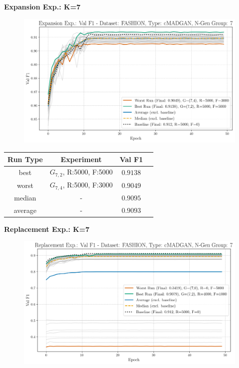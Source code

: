 \newpage
\noindent\textbf{Expansion Exp.: K=7}
\begin{figure}[htbp]
	\centering
	\includegraphics[width=.85\textwidth]{abb/strat_classifier_performance/FASHION_STRATIFIED_CLASSIFIERS_cMADGAN_NEW/expansion_experiments/val_f1_score_cMADGAN_FASHION_n_gen_7_all.png}
	\label{fig:app_strat_class_performance_expansion_exp._val_f1_score_7}
\end{figure}
\begin{table}[H]
	\vspace{-1em}
	\centering
	\begin{tabular}{|c|c|c|c|}
		\hline
		Run Type & Experiment & Val F1 \\ \hline
		best & \(G_{7, 2}\), R:5000, F:5000 & $0.9138$\\ \hline
		worst & \(G_{7, 4}\), R:5000, F:3000 & $0.9049$\\ \hline
		median & - & $0.9095$\\ \hline
		average & - & $0.9093$
		\\ \hline
	\end{tabular}
\end{table}
\noindent\textbf{Replacement Exp.: K=7}
\begin{figure}[htbp]
	\centering
	\includegraphics[width=.85\textwidth]{abb/strat_classifier_performance/FASHION_STRATIFIED_CLASSIFIERS_cMADGAN_NEW/replacement_experiments/val_f1_score_cMADGAN_FASHION_n_gen_7_all.png}
	\label{fig:app_strat_class_performance_replacement_exp._val_f1_score_7}
\end{figure}
